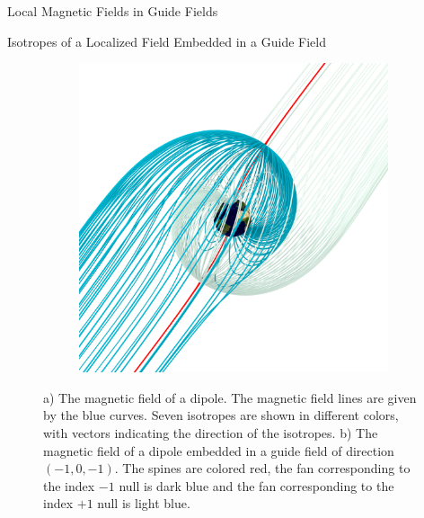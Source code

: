 \documentclass[final]{beamer}
\newlength{\onecolwid}
\begin{document}
\begin{frame}[t]
\begin{columns}[t]
\begin{column}{\onecolwid}
\begin{block}{\huge{Local Magnetic Fields in Guide Fields}}
\begin{block}{Isotropes of a Localized Field Embedded in a Guide Field}
\begin{figure}
\begin{subfigure}[b]{.42\textwidth}
      \includegraphics[width=\textwidth]{fig/separatrix_dipole.png}
      \caption{}
    \end{subfigure}
    \caption{
      a) The magnetic field of a dipole.
      The magnetic field lines are given by the blue curves.
      Seven isotropes are shown in different colors, with vectors indicating the direction of the
      isotropes. b) The magnetic field of a dipole embedded in a guide field of direction $(-1,0,-1)$. 
      The spines are colored red, the fan corresponding to the
      index $-1$ null is dark blue and the fan corresponding to the
      index $+1$ null is light blue.
    }
  \end{figure}
  \begin{figure}
    \centering
    \begin{subfigure}[b]{.42\textwidth}

\end{subfigure}
\end{figure}
\end{block}
\end{block}
\end{column}
\end{columns}
\end{frame}
\end{document}

